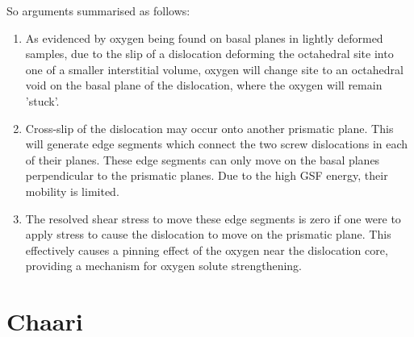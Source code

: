 \documentclass[a4paper,12pt,oneside,print,numbered,index,PageStyleIII]{PhDThesisPSnPDF}
\begin{document}
So arguments summarised as follows:
\begin{enumerate}
\item As evidenced by oxygen being found on basal planes in lightly
deformed samples, due to the slip of a dislocation deforming the
octahedral site into one of a smaller interstitial volume,
oxygen will change site to an octahedral void on the basal plane
of the dislocation, where the oxygen will remain 'stuck'.
\item Cross-slip of the dislocation may occur onto another prismatic
plane. This will generate edge segments which connect the two
screw dislocations in each of their planes. These edge segments
can only move on the basal planes perpendicular to the prismatic
planes. Due to the high GSF energy, their mobility is limited.
\item The resolved shear stress to move these edge segments is zero if
one were to apply stress to cause the dislocation to move on the
prismatic plane. This effectively causes a pinning effect of the
oxygen near the dislocation core, providing a mechanism for
oxygen solute strengthening.
\end{enumerate}

\section{Chaari}
\label{sec:org7725474}
\end{document}
